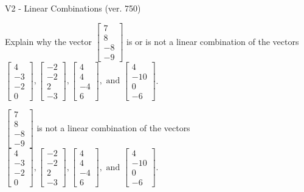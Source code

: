 \begin{exercise}
  \begin{exerciseTitle}V2 - Linear Combinations (ver. 750)\end{exerciseTitle}
  \begin{exerciseStatement}
    Explain why the vector \(\left[\begin{array}{c}
7 \\
8 \\
-8 \\
-9
\end{array}\right]\)  is or is not a linear 
	combination of the vectors \(\left[\begin{array}{c}
4 \\
-3 \\
-2 \\
0
\end{array}\right] , \left[\begin{array}{c}
-2 \\
-2 \\
2 \\
-3
\end{array}\right] , \left[\begin{array}{c}
4 \\
4 \\
-4 \\
6
\end{array}\right] , \text{ and } \left[\begin{array}{c}
4 \\
-10 \\
0 \\
-6
\end{array}\right]\).
	


  \end{exerciseStatement}
  \begin{exerciseAnswer}
   \(\left[\begin{array}{c}
7 \\
8 \\
-8 \\
-9
\end{array}\right]\) 
  	 is not  
	a linear combination of the vectors \(\left[\begin{array}{c}
4 \\
-3 \\
-2 \\
0
\end{array}\right] , \left[\begin{array}{c}
-2 \\
-2 \\
2 \\
-3
\end{array}\right] , \left[\begin{array}{c}
4 \\
4 \\
-4 \\
6
\end{array}\right] , \text{ and } \left[\begin{array}{c}
4 \\
-10 \\
0 \\
-6
\end{array}\right]\).


\end{exerciseAnswer}
\end{exercise}
